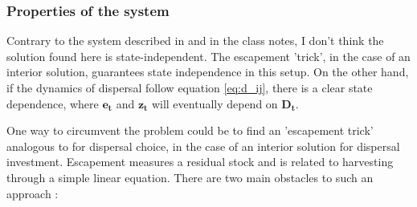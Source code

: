 \documentclass{article}
\begin{document}
\subsubsection{Properties of the system}
Contrary to the system described in \cite{costello_optimal_2008} and in the class notes, I don't think the solution found here is state-independent. The escapement 'trick', in the case of an interior solution, guarantees state independence in this setup. On the other hand, if the dynamics of dispersal follow equation \ref{eq:d_ij}, there is a clear state dependence, where $\mathbf{e_t}$ and $\mathbf{z_t}$ will eventually depend on $\mathbf{D_t}$. 

One way to circumvent the problem could be to find an 'escapement trick' analogous to \cite{costello_optimal_2008} for dispersal choice, in the case of an interior solution for dispersal investment. Escapement measures a residual stock and is related to harvesting through a simple linear equation. There are two main obstacles to such an approach : 
\end{document}
